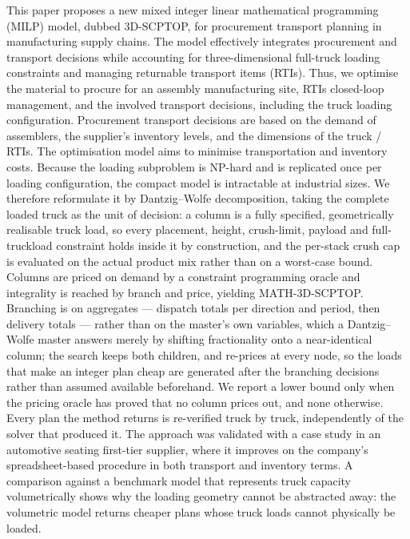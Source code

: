 

{\color{blue}
This paper proposes a new mixed integer linear mathematical programming (MILP) model, dubbed 3D-SCPTOP, for procurement transport planning in manufacturing supply chains. The model effectively integrates procurement and transport decisions while accounting for three-dimensional full-truck loading constraints and managing returnable transport items (RTIs). Thus, we optimise the material to procure for an assembly manufacturing site, RTIs closed-loop management,  and the involved transport decisions, including the truck loading configuration. Procurement transport decisions are based on the demand of assemblers, the supplier's inventory levels, and the dimensions of the truck / RTIs. The optimisation model aims to minimise transportation and inventory costs. Because the loading subproblem is NP-hard and is replicated once per loading configuration, the compact model is intractable at industrial sizes. We therefore reformulate it by Dantzig--Wolfe decomposition, taking the complete loaded truck as the unit of decision: a column is a fully specified, geometrically realisable truck load, so every placement, height, crush-limit, payload and full-truckload constraint holds inside it by construction, and the per-stack crush cap is evaluated on the actual product mix rather than on a worst-case bound. Columns are priced on demand by a constraint programming oracle and integrality is reached by branch and price, yielding MATH-3D-SCPTOP. Branching is on aggregates --- dispatch totals per direction and period, then delivery totals --- rather than on the master's own variables, which a Dantzig--Wolfe master answers merely by shifting fractionality onto a near-identical column; the search keeps both children, and re-prices at every node, so the loads that make an integer plan cheap are generated after the branching decisions rather than assumed available beforehand. We report a lower bound only when the pricing oracle has proved that no column prices out, and none otherwise. Every plan the method returns is re-verified truck by truck, independently of the solver that produced it. The approach was validated with a case study in an automotive seating first-tier supplier, where it improves on the company's spreadsheet-based procedure in both transport and inventory terms. A comparison against a benchmark model that represents truck capacity volumetrically shows why the loading geometry cannot be abstracted away: the volumetric model returns cheaper plans whose truck loads cannot physically be loaded.
}

